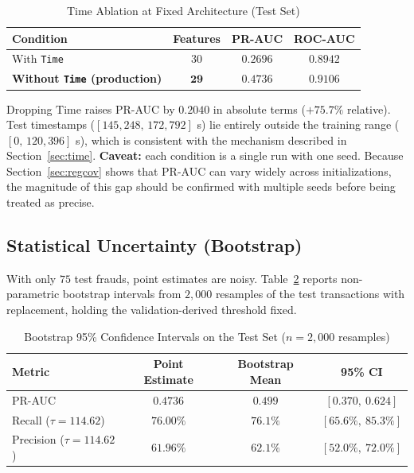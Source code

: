 \documentclass[11pt, a4paper]{article}
\begin{document}
\begin{table}[h!]
\centering
\caption{Time Ablation at Fixed Architecture (Test Set)}
\vspace{0.2cm}
\renewcommand{\arraystretch}{1.25}
\small
\begin{tabular}{lccc}
\toprule
\rowcolor{tableheader}
\textbf{Condition} & \textbf{Features} & \textbf{PR-AUC} & \textbf{ROC-AUC} \\
\midrule
With \texttt{Time} & $30$ & $0.2696$ & $0.8942$ \\
\rowcolor{rowalt}
\textbf{Without \texttt{Time} (production)} & $\mathbf{29}$ & $\mathbf{0.4736}$ & $\mathbf{0.9106}$ \\
\bottomrule
\end{tabular}
\label{tab:ablation}
\end{table}

Dropping $\text{Time}$ raises PR-AUC by $0.2040$ in absolute terms ($+75.7\%$ relative). Test timestamps ($[145{,}248,\,172{,}792]$ s) lie entirely outside the training range ($[0,\,120{,}396]$ s), which is consistent with the mechanism described in Section~\ref{sec:time}. \textbf{Caveat:} each condition is a single run with one seed. Because Section~\ref{sec:regcov} shows that PR-AUC can vary widely across initializations, the magnitude of this gap should be confirmed with multiple seeds before being treated as precise.

\subsection{Statistical Uncertainty (Bootstrap)}
With only $75$ test frauds, point estimates are noisy. Table~\ref{tab:bootstrap} reports non-parametric bootstrap intervals from $2{,}000$ resamples of the test transactions with replacement, holding the validation-derived threshold fixed.

\begin{table}[h!]
\centering
\caption{Bootstrap 95\% Confidence Intervals on the Test Set ($n=2{,}000$ resamples)}
\vspace{0.2cm}
\renewcommand{\arraystretch}{1.25}
\small
\begin{tabular}{lccc}
\toprule
\rowcolor{tableheader}
\textbf{Metric} & \textbf{Point Estimate} & \textbf{Bootstrap Mean} & \textbf{95\% CI} \\
\midrule
PR-AUC & $0.4736$ & $0.499$ & $[0.370,\ 0.624]$ \\
\rowcolor{rowalt}
Recall ($\tau=114.62$) & $76.00\%$ & $76.1\%$ & $[65.6\%,\ 85.3\%]$ \\
Precision ($\tau=114.62$) & $61.96\%$ & $62.1\%$ & $[52.0\%,\ 72.0\%]$ \\
\bottomrule
\end{tabular}
\label{tab:bootstrap}
\end{table}
\end{document}
